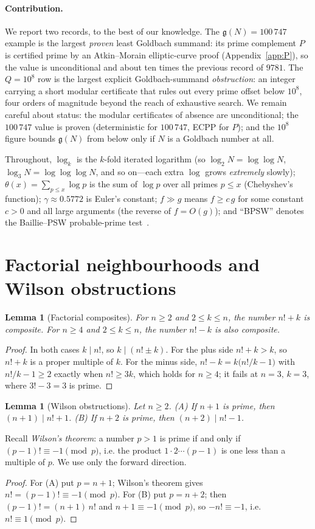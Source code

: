 \documentclass[11pt]{article}
\theoremstyle{plain}
\newtheorem{lemma}[theorem]{Lemma}
\theoremstyle{definition}
\theoremstyle{remark}
\newcommand{\N}{N}
\newcommand{\g}{\mathfrak{g}}
\begin{document}
\paragraph{Contribution.} We report two records, to the best of our knowledge.
The $\g(\N)=100\,747$ example is the largest \emph{proven} least Goldbach summand:
its prime complement $P$ is certified prime by an Atkin--Morain elliptic-curve
proof (Appendix~\ref{app:P}), so the value is unconditional and about ten times
the previous record of $9781$. The $Q=10^8$ row is the largest explicit
Goldbach-summand \emph{obstruction}: an integer carrying a short modular
certificate that rules out every prime offset below $10^8$, four orders of
magnitude beyond the reach of exhaustive search. We remain careful about status:
the modular certificates of absence are unconditional; the $100\,747$ value is
proven (deterministic for $100\,747$, ECPP for $P$); and the $10^8$ figure bounds
$\g(\N)$ from below only if $\N$ is a Goldbach number at all.

Throughout, $\log_k$ is the $k$-fold iterated logarithm (so $\log_2 \N=\log\log
\N$, $\log_3\N=\log\log\log \N$, and so on---each extra $\log$ grows
\emph{extremely} slowly); $\theta(x)=\sum_{p\le x}\log p$ is the sum of $\log p$
over all primes $p\le x$ (Chebyshev's function); $\gamma\approx0.5772$ is Euler's
constant; $f\gg g$ means $f\ge c\,g$ for some constant $c>0$ and all large
arguments (the reverse of $f=O(g)$); and ``BPSW'' denotes the Baillie--PSW
probable-prime test~\cite{PSW}.

\section{Factorial neighbourhoods and Wilson obstructions}\label{sec:factorial}

\begin{lemma}[Factorial composites]\label{lem:fact}
For $n\ge2$ and $2\le k\le n$, the number $n!+k$ is composite. For $n\ge4$ and
$2\le k\le n$, the number $n!-k$ is also composite.
\end{lemma}
\begin{proof}
In both cases $k\mid n!$, so $k\mid(n!\pm k)$. For the plus side $n!+k>k$, so
$n!+k$ is a proper multiple of $k$. For the minus side, $n!-k=k\bigl(n!/k-1\bigr)$
with $n!/k-1\ge2$ exactly when $n!\ge3k$, which holds for $n\ge4$; it fails at
$n=3,\,k=3$, where $3!-3=3$ is prime.
\end{proof}

\begin{lemma}[Wilson obstructions]\label{lem:wilson}
Let $n\ge2$. \emph{(A)} If $n+1$ is prime, then $(n+1)\mid n!+1$. \emph{(B)} If
$n+2$ is prime, then $(n+2)\mid n!-1$.
\end{lemma}
\noindent Recall \emph{Wilson's theorem}: a number $p>1$ is prime if and only if
$(p-1)!\equiv-1\pmod p$, i.e. the product $1\cdot2\cdots(p-1)$ is one less than a
multiple of $p$. We use only the forward direction.
\begin{proof}
For (A) put $p=n+1$; Wilson's theorem gives $n!=(p-1)!\equiv-1\pmod p$. For (B)
put $p=n+2$; then $(p-1)!=(n+1)\,n!$ and $n+1\equiv-1\pmod p$, so
$-n!\equiv-1$, i.e. $n!\equiv1\pmod p$.
\end{proof}
\end{document}
